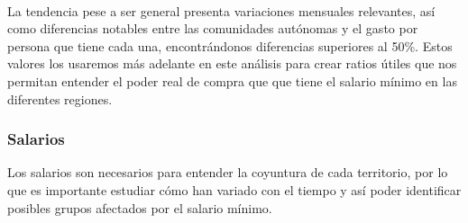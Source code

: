 \documentclass[11pt]{article}
\begin{document}
    \begin{center}
    \end{center}
    { \hspace*{\fill} \\}
    
    La tendencia pese a ser general presenta variaciones mensuales
relevantes, así como diferencias notables entre las comunidades
autónomas y el gasto por persona que tiene cada una, encontrándonos
diferencias superiores al 50\%. Estos valores los usaremos más adelante
en este análisis para crear ratios útiles que nos permitan entender el
poder real de compra que que tiene el salario mínimo en las diferentes
regiones.

    \subsubsection{Salarios}\label{salarios}

    Los salarios son necesarios para entender la coyuntura de cada
territorio, por lo que es importante estudiar cómo han variado con el
tiempo y así poder identificar posibles grupos afectados por el salario
mínimo.
\end{document}
